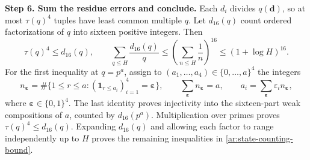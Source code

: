 \documentclass[twoside]{aomart}
\makeatletter
\theoremstyle{paperplain}
\theoremstyle{paperdefinition}
\renewenvironment{proof}[1][\proofname]{\par\pushQED{\qed}%
  \normalfont\topsep6\p@\@plus3\p@\relax\trivlist
  \item[\hskip\labelsep\itshape #1\@addpunct{.}]\ignorespaces
}{\popQED\endtrivlist\@endpefalse}
\numberwithin{equation}{section}
\makeatother
\begin{document}
\begin{proof}
\par
\medskip
\noindent\textbf{Step 6. Sum the residue errors and conclude.}
Each $d_i$ divides $q(\mathbf d)$, so at most $\tau(q)^4$ tuples
have least common multiple $q$. Let $d_{16}(q)$ count ordered
factorizations of $q$ into sixteen positive integers. Then
\begin{equation}
 \tau(q)^4\le d_{16}(q),\qquad
 \sum_{q\le H}\frac{d_{16}(q)}q
 \le\left(\sum_{n\le H}\frac1n\right)^{16}
 \le(1+\log H)^{16}.
 \label{ar:state-counting-bound}
\end{equation}
For the first inequality at $q=p^a$, assign to
$(a_1,\ldots,a_4)\in\{0,\ldots,a\}^4$ the integers
\begin{equation*}
 n_{\boldsymbol\varepsilon}
 =\#\{1\le r\le a:(\mathbf1_{r\le a_i})_{i=1}^4
                       =\boldsymbol\varepsilon\},\qquad
 \sum_{\boldsymbol\varepsilon}n_{\boldsymbol\varepsilon}=a,
 \qquad
 a_i=\sum_{\boldsymbol\varepsilon}\varepsilon_i n_{\boldsymbol\varepsilon},
 \end{equation*}
where $\boldsymbol\varepsilon\in\{0,1\}^4$.
The last identity proves injectivity into the sixteen-part weak
compositions of $a$, counted by $d_{16}(p^a)$.
Multiplication over primes proves $\tau(q)^4\le d_{16}(q)$.
Expanding $d_{16}(q)$ and allowing each factor to range independently
up to $H$ proves the remaining inequalities in
\eqref{ar:state-counting-bound}.


\end{proof}
\end{document}

